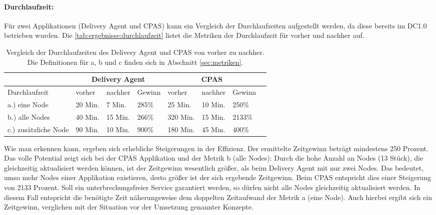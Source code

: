 \paragraph{Durchlaufzeit:}
Für zwei Applikationen (Delivery Agent und CPAS) kann ein Vergleich der Durchlaufzeiten aufgestellt werden, da diese bereits im DC1.0 betrieben wurden. Die \autoref{tab:ergebnisse:durchlaufzeit} listet die Metriken der Durchlaufzeit für vorher und nachher auf.

\begin{table}[ht]
\setlength{\tabcolsep}{5pt}
\renewcommand{\arraystretch}{1.5}
\centering
\begin{tabular}{|l|l|l|l|l|l|l|l|}
\hline
\rowcolor[HTML]{C0C0C0}
\multicolumn{1}{|c|}{\textbf{Metrik}} & \multicolumn{3}{|c|}{\textbf{Delivery Agent}} & \multicolumn{3}{|c|}{\textbf{CPAS}}				\\ 
\hline
Durchlaufzeit & vorher & nachher & Gewinn & vorher & nachher & Gewinn \\
\hline
a.) eine Node		& 20 Min. & 7 Min. & 285\% &	25 Min. & 10 Min. & 250\%\\ 
\hline
b.) alle Nodes		& 40 Min. & 15 Min. & 266\% & 320 Min. & 15 Min. & 2133\%\\ 
\hline						
c.) zusätzliche Node	& 90 Min. & 10 Min. & 900\% & 180 Min. & 45 Min. & 400\%\\
\hline
\end{tabular}
\caption[Vergleich der Durchlaufzeiten von vorher und nachher]{Vergleich der Durchlaufzeiten des Delivery Agent und CPAS von vorher zu nachher. Die Definitionen für a, b und c finden sich in Abschnitt \ref{sec:metriken}.}
\label{tab:ergebnisse:durchlaufzeit}
\end{table}

Wie man erkennen kann, ergeben sich erhebliche Steigerungen in der Effizienz. Der ermittelte Zeitgewinn beträgt mindestens 250 Prozent. Das volle Potential zeigt sich bei der CPAS Applikation und der Metrik b (alle Nodes): Durch die hohe Anzahl an Nodes (13 Stück), die gleichzeitig aktualisiert werden können, ist der Zeitgewinn wesentlich größer, als beim Delivery Agent mit nur zwei Nodes. Das bedeutet, umso mehr Nodes einer Applikation existieren, desto größer ist der sich ergebende Zeitgewinn. Beim CPAS entspricht dies einer Steigerung von 2133 Prozent. Soll ein unterbrechungsfreier Service garantiert werden, so dürfen nicht alle Nodes gleichzeitig aktualisiert werden. In diesem Fall entspricht die benötigte Zeit näherungsweise dem doppelten Zeitaufwand der Metrik a (eine Node). Auch hierbei ergibt sich ein Zeitgewinn, verglichen mit der Situation vor der Umsetzung genannter Konzepte. 


